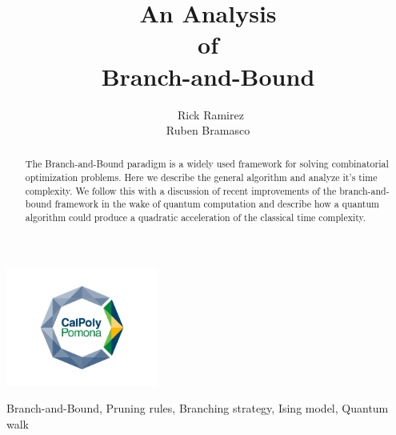 \documentclass[]{IEEEphot}
\begin{document}
	
	\title{An Analysis\\ of \\ Branch-and-Bound}
	
	\author{~Rick Ramirez \\ Ruben Bramasco}
	
	\maketitle
	\vspace{-2cm}
	\begin{center}
    	\includegraphics[width=5cm]{images/primary-logo-inside-stacked}\\
    \end{center}
	\vspace{0.25cm}

	\begin{abstract}
		\doublespacing\small
		The Branch-and-Bound paradigm is a widely used framework for solving combinatorial optimization problems.
		Here we describe the general algorithm and analyze it's time complexity.
		We follow this with a discussion of recent improvements of the branch-and-bound framework in the wake of quantum computation and describe how a quantum algorithm could produce a quadratic acceleration of the classical time complexity.
	\end{abstract}

	\begin{IEEEkeywords}
		Branch-and-Bound, Pruning rules, Branching strategy, Ising model, Quantum walk
	\end{IEEEkeywords}

	
	
	
	
	
	
	
	
	
	
	
	
	
	
	
	
	
	
	
	
	\newpage
	
	
	
		
	
\end{document}
